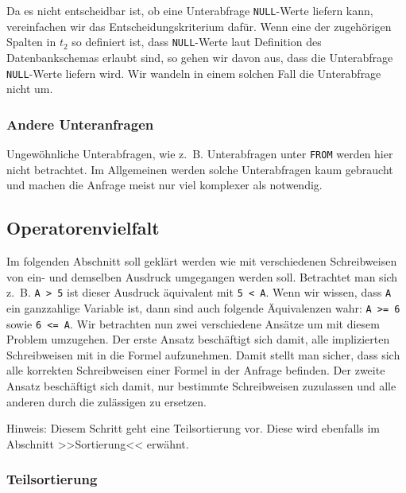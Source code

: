 Da es nicht entscheidbar ist, ob eine Unterabfrage \verb|NULL|-Werte liefern kann, vereinfachen wir das Entscheidungskriterium dafür. Wenn eine der zugehörigen Spalten in $t_2$ so definiert ist, dass \verb|NULL|-Werte laut Definition des Datenbankschemas erlaubt sind, so gehen wir davon aus, dass die Unterabfrage \verb|NULL|-Werte liefern wird. Wir wandeln in einem solchen Fall die Unterabfrage nicht um.

\subsubsection{Andere Unteranfragen}

Ungewöhnliche Unterabfragen, wie \mbox{z. B.} Unterabfragen unter \verb|FROM| werden hier nicht betrachtet. Im Allgemeinen werden solche Unterabfragen kaum gebraucht und machen die Anfrage meist nur viel komplexer als notwendig.

\subsection{Operatorenvielfalt}

Im folgenden Abschnitt soll geklärt werden wie mit verschiedenen Schreibweisen von ein- und demselben Ausdruck umgegangen werden soll. Betrachtet man sich \mbox{z. B.} \verb|A > 5| ist dieser Ausdruck äquivalent mit \verb|5 < A|. Wenn wir wissen, dass \verb|A| ein ganzzahlige Variable ist, dann sind auch folgende Äquivalenzen wahr: \verb|A >= 6| sowie \verb|6 <= A|. Wir betrachten nun zwei verschiedene Ansätze um mit diesem Problem umzugehen. Der erste Ansatz beschäftigt sich damit, alle implizierten Schreibweisen mit in die Formel aufzunehmen. Damit stellt man sicher, dass sich alle korrekten Schreibweisen einer Formel in der Anfrage befinden. Der zweite Ansatz beschäftigt sich damit, nur bestimmte Schreibweisen zuzulassen und alle anderen durch die zulässigen zu ersetzen.

Hinweis: Diesem Schritt geht eine Teilsortierung vor. Diese wird ebenfalls im Abschnitt >>Sortierung<< erwähnt. 

\subsubsection{Teilsortierung}

